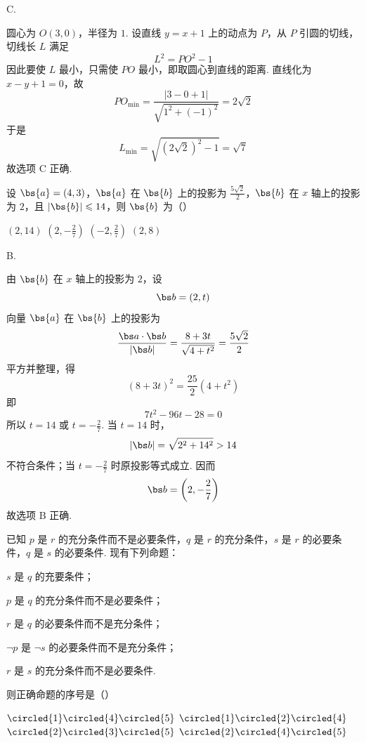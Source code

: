 \begin{answer}
C.
\end{answer}

\begin{solution}
圆心为 \(O(3,0)\)，半径为 \(1\). 设直线 \(y=x+1\) 上的动点为 \(P\)，从 \(P\) 引圆的切线，切线长 \(L\) 满足
\[
L^2=PO^2-1
\]
因此要使 \(L\) 最小，只需使 \(PO\) 最小，即取圆心到直线的距离. 直线化为 \(x-y+1=0\)，故
\[
PO_{\min}=\frac{|3-0+1|}{\sqrt{1^2+(-1)^2}}=2\sqrt2
\]
于是
\[
L_{\min}=\sqrt{(2\sqrt2)^2-1}=\sqrt7
\]
故选项 C 正确.
\end{solution}

\begin{problem}
设 \(\bs{a}=(4,3)\)，\(\bs{a}\) 在 \(\bs{b}\) 上的投影为 \( \frac{5\sqrt{2}}{2} \)，\(\bs{b}\) 在 \(x\) 轴上的投影为 \(2\)，且 \(\left|\bs{b}\right|\leqslant14\)，则 \(\bs{b}\) 为（\quad）

\choices
    {\((2,14)\)}
    {\( \left(2,-\frac{2}{7}\right) \)}
    {\( \left(-2,\frac{2}{7}\right) \)}
    {\((2,8)\)}
\end{problem}

\begin{answer}
B.
\end{answer}

\begin{solution}
由 \(\bs{b}\) 在 \(x\) 轴上的投影为 \(2\)，设
\[
\bs b=(2,t)
\]
向量 \(\bs{a}\) 在 \(\bs{b}\) 上的投影为
\[
\frac{\bs a\cdot\bs b}{|\bs b|}=\frac{8+3t}{\sqrt{4+t^2}}=\frac{5\sqrt2}{2}
\]
平方并整理，得
\[
(8+3t)^2=\frac{25}{2}(4+t^2)
\]
即
\[
7t^2-96t-28=0
\]
所以 \(t=14\) 或 \(t=-\frac{2}{7}\). 当 \(t=14\) 时，
\[
|\bs b|=\sqrt{2^2+14^2}>14
\]
不符合条件；当 \(t=-\frac{2}{7}\) 时原投影等式成立. 因而
\[
\bs b=\left(2,-\frac27\right)
\]
故选项 B 正确.
\end{solution}

\begin{problem}
已知 \(p\) 是 \(r\) 的充分条件而不是必要条件，\(q\) 是 \(r\) 的充分条件，\(s\) 是 \(r\) 的必要条件，\(q\) 是 \(s\) 的必要条件. 现有下列命题：

\begin{circlelist}
\item \(s\) 是 \(q\) 的充要条件；
\item \(p\) 是 \(q\) 的充分条件而不是必要条件；
\item \(r\) 是 \(q\) 的必要条件而不是充分条件；
\item \(\neg p\) 是 \(\neg s\) 的必要条件而不是充分条件；
\item \(r\) 是 \(s\) 的充分条件而不是必要条件.
\end{circlelist}

则正确命题的序号是（\quad）

\choices
    {\(\circled{1}\circled{4}\circled{5}\)}
    {\(\circled{1}\circled{2}\circled{4}\)}
    {\(\circled{2}\circled{3}\circled{5}\)}
    {\(\circled{2}\circled{4}\circled{5}\)}
\end{problem}

